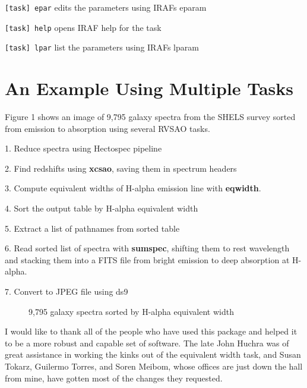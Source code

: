 \documentclass[11pt,twoside]{article}
\begin{document}
\texttt{[task] epar} edits the parameters using IRAFs eparam

\texttt{[task] help} opens IRAF help for the task

\texttt{[task] lpar} list the parameters using IRAFs lparam

\section*{An Example Using Multiple Tasks}

Figure 1 shows an image of 9,795 galaxy spectra from the SHELS survey
\citep{shels_2005}
sorted from emission to absorption using several RVSAO tasks.

1.  Reduce spectra using Hectospec pipeline

2.  Find redshifts using \textbf{xcsao}, saving them in spectrum headers

3.  Compute equivalent widths of H-alpha emission line with \textbf{eqwidth}.

4. Sort the output table by H-alpha equivalent width

5. Extract a list of pathnames from sorted table

6. Read sorted list of spectra with \textbf{sumspec}, shifting them to rest wavelength and
stacking them into a FITS file from bright emission to deep absorption at H-alpha.

7. Convert to JPEG file using ds9

\begin{figure}[!ht]
\caption{9,795 galaxy spectra sorted by H-alpha equivalent width}
\end{figure}

\acknowledgements
I would like to thank all of the people who have used this package and helped
it to be a more robust and capable set of software.  The late John Huchra was of
great assistance in working the kinks out of the equivalent width task, and
Susan Tokarz, Guilermo Torres, and Soren Meibom, whose offices are just down
the hall from mine, have gotten most of the changes they requested.


\end{document}

